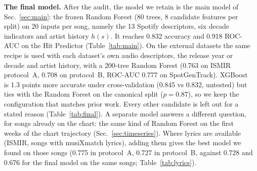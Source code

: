 \documentclass[conference]{IEEEtran}
\begin{document}
\textbf{The final model.} After the audit, the model we retain is the main model of
Sec.~\ref{sec:main}: the frozen Random Forest (80 trees, 8 candidate features per split) on 20
inputs per song, namely the 13 Spotify descriptors, six decade indicators and artist history
$h(s)$. It reaches 0.832 accuracy and 0.918 ROC-AUC on the Hit Predictor
(Table~\ref{tab:main}). On the external datasets the same recipe is used with each dataset's
own audio descriptors, the release year or decade and artist history, with a 200-tree Random
Forest (0.763 on ISMIR protocol~A, 0.708 on protocol~B, ROC-AUC 0.777 on SpotGenTrack).
XGBoost is 1.3 points more accurate under cross-validation (0.845 vs 0.832, untested) but ties with the Random Forest on
the canonical split ($p=0.87$), so we keep the configuration that matches prior work. Every
other candidate is left out for a stated reason (Table~\ref{tab:final}). A separate model
answers a different question, for songs already on the chart: the same kind of Random Forest
on the first weeks of the chart trajectory (Sec.~\ref{sec:timeseries}). Where lyrics are available
(ISMIR, songs with musiXmatch lyrics), adding them gives the best model we found on those songs (0.775 in
protocol~A, 0.727 in protocol~B, against 0.728 and 0.676 for the final model on the same songs;
Table~\ref{tab:lyrics}).
\end{document}
